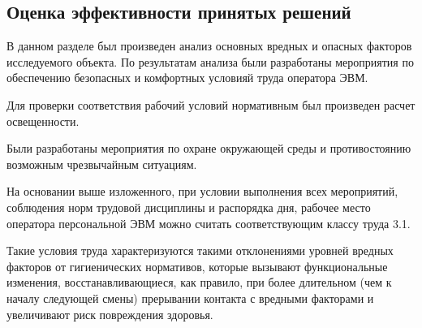 \subsection{Оценка эффективности принятых решений}

В данном разделе был произведен анализ основных вредных и опасных факторов исследуемого объекта.
По результатам анализа были разработаны мероприятия по обеспечению безопасных и комфортных условияй труда оператора ЭВМ.

Для проверки соответствия рабочий условий нормативным был произведен расчет освещенности.

Были разработаны мероприятия по охране окружающей среды и противостоянию возможным чрезвычайным ситуациям.

На основании выше изложенного, при условии выполнения всех мероприятий, соблюдения норм трудовой дисциплины и распорядка дня, рабочее место оператора персональной ЭВМ можно считать соответствующим классу труда 3.1.

Такие условия труда характеризуются такими отклонениями уровней вредных факторов от гигиенических нормативов, которые вызывают функциональные изменения, восстанавливающиеся, как правило, при более длительном (чем к началу следующей смены) прерывании контакта с вредными факторами и увеличивают риск повреждения здоровья.

\clearpage
\newpage
